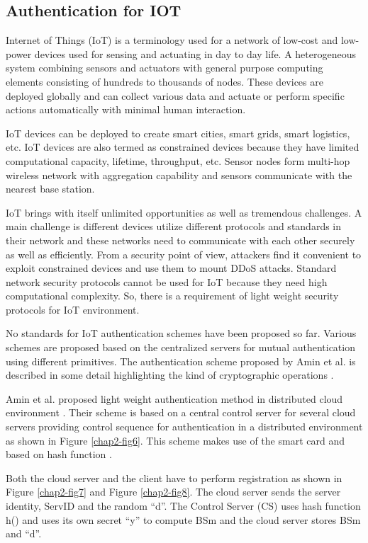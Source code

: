 \begin{multicols}{2}
\section{Authentication for IOT}

\vskip -5pt

Internet of Things (IoT) is a terminology used for a network of low-cost and low-power devices used for sensing and actuating in day to day life. A heterogeneous system combining sensors and actuators with general purpose computing elements consisting of hundreds to thousands of nodes. These devices are deployed globally and can collect various data and actuate or perform specific actions automatically with minimal human interaction.

IoT devices can be deployed to create smart cities, smart grids, smart logistics, etc. IoT devices are also termed as constrained devices because they have limited computational capacity, lifetime, throughput, etc. Sensor nodes form multi-hop wireless network with aggregation capability and sensors communicate with the nearest base station. 

IoT brings with itself unlimited opportunities as well as tremendous challenges. A main challenge is different devices utilize different protocols and standards in their network and these networks need to communicate with each other securely as well as efficiently. From a security point of view, attackers find it convenient to exploit constrained devices and use them to mount DDoS attacks. Standard network security protocols cannot be used for IoT because they need high computational complexity. So, there is a requirement of light weight security protocols for IoT environment.

No standards for IoT authentication schemes have been proposed so far. Various schemes are proposed based on the centralized servers for mutual authentication using different primitives. The authentication scheme proposed by Amin et al. is described in some detail highlighting the kind of cryptographic operations \cite{chap2-key22}.

Amin et al. proposed light weight authentication method in distributed cloud environment \cite{chap2-key19}. Their scheme is based on a central control server for several cloud servers providing control sequence for authentication in a distributed environment as shown in Figure \ref{chap2-fig6}. This scheme makes use of the smart card and based on hash function \cite{chap2-key23}.

Both the cloud server and the client have to perform registration as shown in Figure \ref{chap2-fig7} and Figure \ref{chap2-fig8}. The cloud server sends the server identity, ServID and the random ``d''. The Control Server (CS) uses hash function h() and uses its own secret ``y'' to compute BSm and the cloud server stores BSm and ``d''.


\end{multicols}
